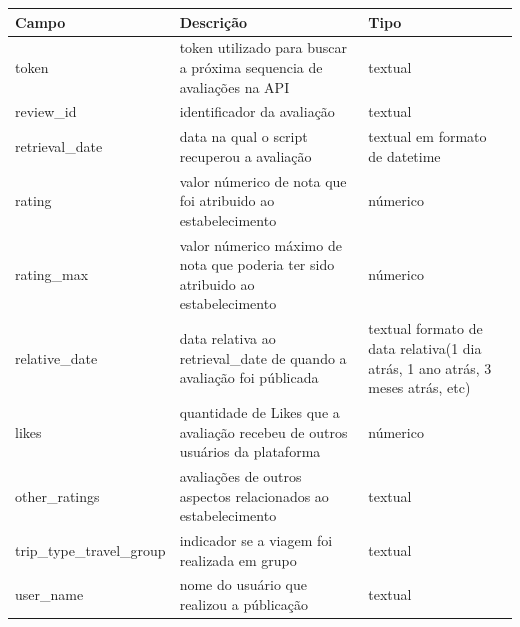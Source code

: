 \begin{table}[]
	\centering
	\begin{tabular}{|l|p{5cm}|p{5cm}|}
		\hline
		\textbf{Campo}            & \textbf{Descrição}                                                              & \textbf{Tipo}                                                                  \\
		\hline
		token                     & token utilizado para buscar a próxima sequencia de avaliações na API            & textual                                                                        \\
		\hline
		review\_id                & identificador da avaliação                                                      & textual                                                                        \\
		\hline
		retrieval\_date           & data na qual o script recuperou a avaliação                                     & textual em formato de datetime                                                 \\
		\hline
		rating                    & valor númerico de nota que foi atribuido ao estabelecimento                     & númerico                                                                       \\
		\hline
		rating\_max               & valor númerico máximo de nota que poderia ter sido atribuido ao estabelecimento & númerico                                                                       \\
		\hline
		relative\_date            & data relativa ao retrieval\_date de quando a avaliação foi públicada            & textual formato de data relativa(1 dia atrás, 1 ano atrás, 3 meses atrás, etc) \\
		\hline
		likes                     & quantidade de Likes que a avaliação recebeu de outros usuários da plataforma    & númerico                                                                       \\
		\hline
		other\_ratings            & avaliações de outros aspectos relacionados ao estabelecimento                   & textual                                                                        \\
		\hline
		trip\_type\_travel\_group & indicador se a viagem foi realizada em grupo                                    & textual                                                                        \\
		\hline
		user\_name                & nome do usuário que realizou a públicação                                       & textual                                                                        \\

\end{tabular}
\end{table}
